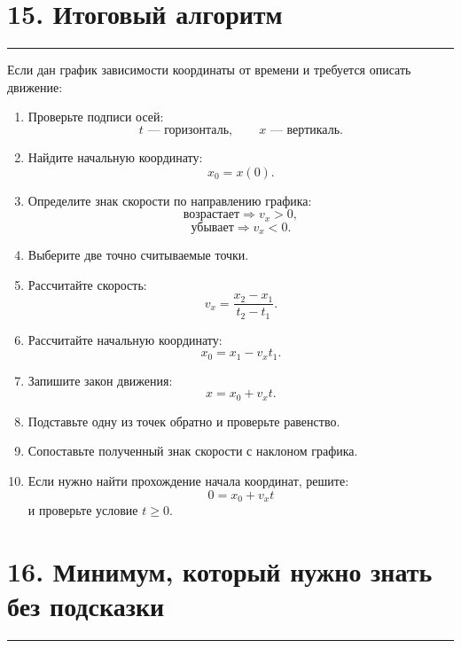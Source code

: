 \documentclass[a4paper,12pt]{article}
\newcommand{\sectionline}{%
  \par\noindent\color{accent}\rule{\linewidth}{0.5pt}\color{textgray}\par
}
\begin{document}
\section{\color{darkaccent}15. Итоговый алгоритм}
\sectionline

Если дан график зависимости координаты от времени и требуется описать движение:

\begin{enumerate}[label=\arabic*),leftmargin=*,itemsep=0.45em]

    \item Проверьте подписи осей:
    \[
    t \text{ --- горизонталь},\qquad x \text{ --- вертикаль}.
    \]

    \item Найдите начальную координату:
    \[
    x_0=x(0).
    \]

    \item Определите знак скорости по направлению графика:
    \[
    \text{возрастает} \Rightarrow v_x>0,
    \]
    \[
    \text{убывает} \Rightarrow v_x<0.
    \]

    \item Выберите две точно считываемые точки.

    \item Рассчитайте скорость:
    \[
    v_x=\frac{x_2-x_1}{t_2-t_1}.
    \]

    \item Рассчитайте начальную координату:
    \[
    x_0=x_1-v_xt_1.
    \]

    \item Запишите закон движения:
    \[
    x=x_0+v_xt.
    \]

    \item Подставьте одну из точек обратно и проверьте равенство.

    \item Сопоставьте полученный знак скорости с наклоном графика.

    \item Если нужно найти прохождение начала координат, решите:
    \[
    0=x_0+v_xt
    \]
    и проверьте условие \(t\ge0\).

\end{enumerate}


\section{\color{darkaccent}16. Минимум, который нужно знать без подсказки}
\sectionline
\end{document}
